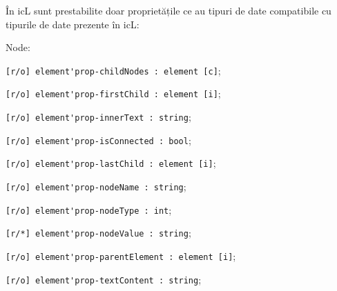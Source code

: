 În icL sunt prestabilite doar proprietățile ce au tipuri de date compatibile cu tipurile de date prezente în icL:
\begin{icItems}
	\item Node:	
	\begin{icItems}
		\item \lstinline|[r/o] element'prop-childNodes : element [c]|;
		\item \lstinline|[r/o] element'prop-firstChild : element [i]|;
		\item \lstinline|[r/o] element'prop-innerText : string|;
		\item \lstinline|[r/o] element'prop-isConnected : bool|;
		\item \lstinline|[r/o] element'prop-lastChild : element [i]|;
		\item \lstinline|[r/o] element'prop-nodeName : string|;
		\item \lstinline|[r/o] element'prop-nodeType : int|;
		\item \lstinline|[r/*] element'prop-nodeValue : string|;
		\item \lstinline|[r/o] element'prop-parentElement : element [i]|;
		\item \lstinline|[r/o] element'prop-textContent : string|;
	\end{icItems}
	

\end{icItems}
